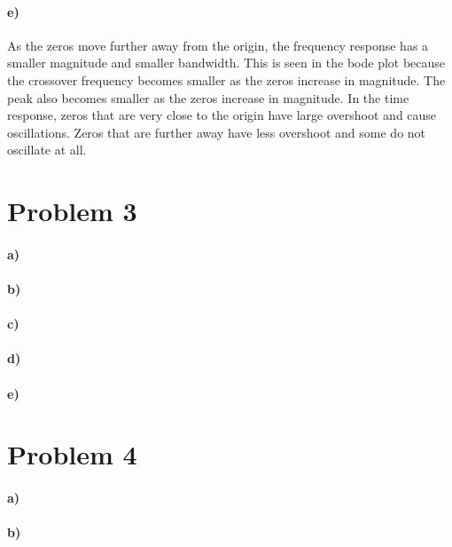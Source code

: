 \documentclass[12pt]{article}
\begin{document}
\paragraph{e)}

As the zeros move further away from the origin, the frequency response has a smaller magnitude and smaller bandwidth.
This is seen in the bode plot because the crossover frequency becomes smaller as the zeros increase in magnitude.
The peak also becomes smaller as the zeros increase in magnitude. In the time response, zeros that are very close
to the origin have large overshoot and cause oscillations. Zeros that are further away have less overshoot and
some do not oscillate at all.

\section*{Problem 3}

\paragraph{a)}

\paragraph{b)}

\paragraph{c)}

\paragraph{d)}

\paragraph{e)}

\section*{Problem 4}

\paragraph{a)}

\paragraph{b)}
\end{document}
